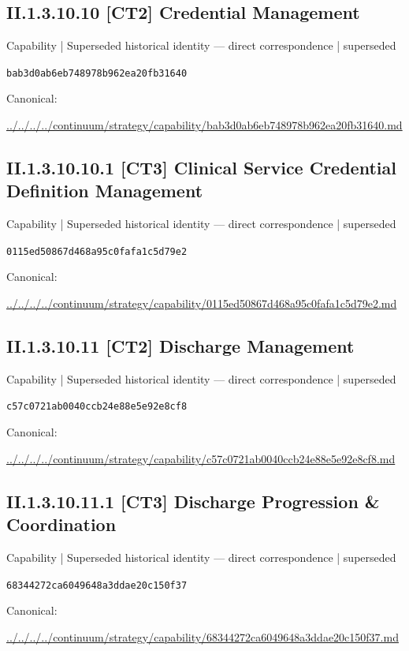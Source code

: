 \documentclass[10pt,a4paper]{article}
\begin{document}
\subsection*{II.1.3.10.10 [CT2] Credential Management}
{\small Capability | Superseded historical identity — direct correspondence | superseded}\par
\texttt{bab3d0ab6eb748978b962ea20fb31640}\par
Canonical: \par
{\footnotesize\url{../../../../continuum/strategy/capability/bab3d0ab6eb748978b962ea20fb31640.md}}\par
\subsection*{II.1.3.10.10.1 [CT3] Clinical Service Credential Definition Management}
{\small Capability | Superseded historical identity — direct correspondence | superseded}\par
\texttt{0115ed50867d468a95c0fafa1c5d79e2}\par
Canonical: \par
{\footnotesize\url{../../../../continuum/strategy/capability/0115ed50867d468a95c0fafa1c5d79e2.md}}\par
\subsection*{II.1.3.10.11 [CT2] Discharge Management}
{\small Capability | Superseded historical identity — direct correspondence | superseded}\par
\texttt{c57c0721ab0040ccb24e88e5e92e8cf8}\par
Canonical: \par
{\footnotesize\url{../../../../continuum/strategy/capability/c57c0721ab0040ccb24e88e5e92e8cf8.md}}\par
\subsection*{II.1.3.10.11.1 [CT3] Discharge Progression \& Coordination}
{\small Capability | Superseded historical identity — direct correspondence | superseded}\par
\texttt{68344272ca6049648a3ddae20c150f37}\par
Canonical: \par
{\footnotesize\url{../../../../continuum/strategy/capability/68344272ca6049648a3ddae20c150f37.md}}\par
\end{document}
